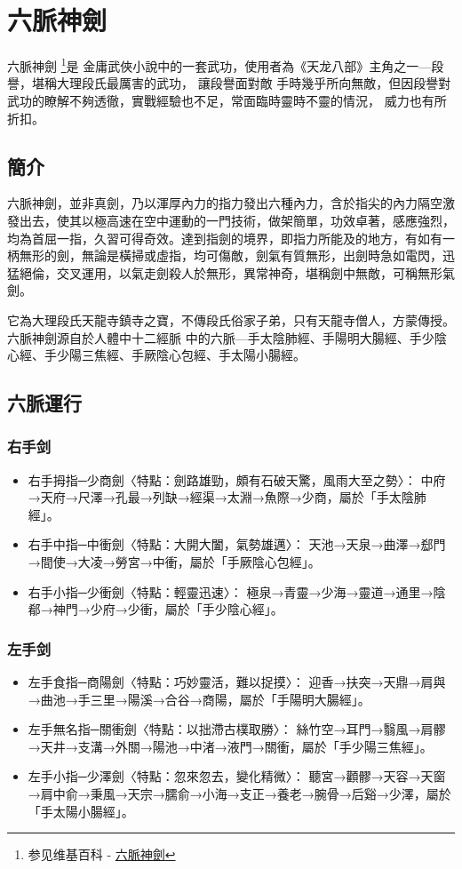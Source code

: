 \chapter{六脈神劍}
六脈神劍
\footnote{参见维基百科 -
  \href{http://zh.wikipedia.org/wiki/\%E5\%85\%AD\%E8\%84\%88\%E7\%A5\%9E\%E5\%8A\%8D}{六脈神劍}}是
金庸武俠小說中的一套武功，使用者為《天龙八部》主角之一—段譽，堪稱大理段氏最厲害的武功， 讓段譽面對敵
手時幾乎所向無敵，但因段譽對武功的瞭解不夠透徹，實戰經驗也不足，常面臨時靈時不靈的情況， 威力也有所折扣。

\section{簡介}
六脈神劍，並非真劍，乃以渾厚內力的指力發出六種內力，含於指尖的內力隔空激發出去，使其以極高速在空中運動的一門技術，做架簡單，功效卓著，感應強烈，均為首屈一指，久習可得奇效。達到指劍的境界，即指力所能及的地方，有如有一柄無形的劍，無論是橫掃或虛指，均可傷敵，劍氣有質無形，出劍時急如電閃，迅猛絕倫，交叉運用，以氣走劍殺人於無形，異常神奇，堪稱劍中無敵，可稱無形氣劍。

它為大理段氏天龍寺鎮寺之寶，不傳段氏俗家子弟，只有天龍寺僧人，方蒙傳授。六脈神劍源自於人體中十二經脈
中的六脈—手太陰肺經、手陽明大腸經、手少陰心經、手少陽三焦經、手厥陰心包經、手太陽小腸經。

\section{六脈運行}

\subsection{右手剑}
\begin{itemize}
\item 右手拇指─少商劍〈特點：劍路雄勁，頗有石破天驚，風雨大至之勢〉：
中府→天府→尺澤→孔最→列缺→經渠→太淵→魚際→少商，屬於「手太陰肺經」。
\item 右手中指─中衝劍〈特點：大開大闔，氣勢雄邁〉：
天池→天泉→曲澤→郄門→間使→大凌→勞宮→中衝，屬於「手厥陰心包經」。
\item 右手小指─少衝劍〈特點：輕靈迅速〉：
極泉→青靈→少海→靈道→通里→陰郩→神門→少府→少衝，屬於「手少陰心經」。
\end{itemize}
\subsection{左手剑}
\begin{itemize}
\item 左手食指─商陽劍〈特點：巧妙靈活，難以捉摸〉：
迎香→扶突→天鼎→肩與→曲池→手三里→陽溪→合谷→商陽，屬於「手陽明大腸經」。
\item 左手無名指─關衝劍〈特點：以拙滯古樸取勝〉：
絲竹空→耳門→翳風→肩髎→天井→支溝→外關→陽池→中渚→液門→關衝，屬於「手少陽三焦經」。
\item 左手小指─少澤劍〈特點：忽來忽去，變化精微〉：
聽宮→顴髎→天容→天窗→肩中俞→秉風→天宗→臑俞→小海→支正→養老→腕骨→后谿→少澤，屬於「手太陽小腸經」。
\end{itemize}

